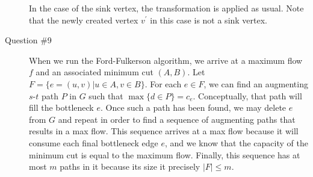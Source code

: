 \documentclass[letterpaper,11pt]{article}
\begin{document}
\begin{description}
        In the case of the sink vertex, the transformation is applied as usual.
        Note that the newly created vertex $v^\prime$ in this case is not a
        sink vertex.

    \item[Question \#9]

        When we run the Ford-Fulkerson algorithm, we arrive at a maximum flow
        $f$ and an associated minimum cut $(A, B)$. Let
        $F = \{e = (u, v) | u \in A, v \in B\}$. For each $e \in F$, we can
        find an augmenting $s$-$t$ path $P$ in $G$ such that
        $\max \{d \in P\} = c_e$. Conceptually, that path will fill the
        bottleneck $e$. Once such a path has been found, we may delete $e$ from
        $G$ and repeat in order to find a sequence of augmenting paths that
        results in a max flow. This sequence arrives at a max flow because it
        will consume each final bottleneck edge $e$, and we know that the
        capacity of the minimum cut is equal to the maximum flow. Finally,
        this sequence has at most $m$ paths in it because its size it precisely
        $|F| \leq m$.

\end{description}
\end{document}
